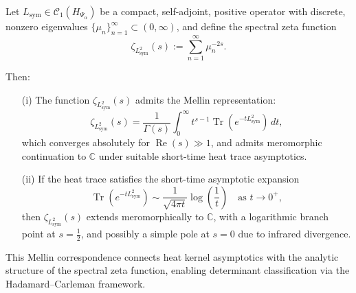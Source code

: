 \begin{lemma}
\label{lem:spectral_zeta_from_heat}
Let \( L_{\mathrm{sym}} \in \mathcal{C}_1(H_{\Psi_\alpha}) \) be a compact, self-adjoint, positive operator with discrete, nonzero eigenvalues \( \{ \mu_n \}_{n=1}^\infty \subset (0, \infty) \), and define the spectral zeta function
\[
\zeta_{L_{\mathrm{sym}}^2}(s) := \sum_{n=1}^\infty \mu_n^{-2s}.
\]

Then:
\begin{enumerate}
    \item[\textnormal{(i)}] The function \( \zeta_{L_{\mathrm{sym}}^2}(s) \) admits the Mellin representation:
    \[
    \zeta_{L_{\mathrm{sym}}^2}(s)
    = \frac{1}{\Gamma(s)} \int_0^\infty t^{s-1} \operatorname{Tr}(e^{-t L_{\mathrm{sym}}^2}) \, dt,
    \]
    which converges absolutely for \( \operatorname{Re}(s) \gg 1 \), and admits meromorphic continuation to \( \mathbb{C} \) under suitable short-time heat trace asymptotics.

    \item[\textnormal{(ii)}] If the heat trace satisfies the short-time asymptotic expansion
    \[
    \operatorname{Tr}(e^{-t L_{\mathrm{sym}}^2}) \sim \frac{1}{\sqrt{4\pi t}} \log\left( \frac{1}{t} \right)
    \quad \text{as } t \to 0^+,
    \]
    then \( \zeta_{L_{\mathrm{sym}}^2}(s) \) extends meromorphically to \( \mathbb{C} \), with a logarithmic branch point at \( s = \tfrac{1}{2} \), and possibly a simple pole at \( s = 0 \) due to infrared divergence.
\end{enumerate}

\medskip
\noindent
This Mellin correspondence connects heat kernel asymptotics with the analytic structure of the spectral zeta function, enabling determinant classification via the Hadamard--Carleman framework.
\end{lemma}
